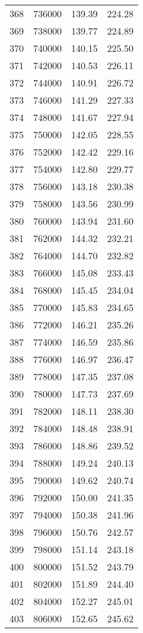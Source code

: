 \documentclass{article}
\begin{document}
\begin{longtable}{@{}l l l l}
368 & 736000 & 139.39 & 224.28\\
369 & 738000 & 139.77 & 224.89\\
370 & 740000 & 140.15 & 225.50\\
371 & 742000 & 140.53 & 226.11\\
372 & 744000 & 140.91 & 226.72\\
373 & 746000 & 141.29 & 227.33\\
374 & 748000 & 141.67 & 227.94\\
375 & 750000 & 142.05 & 228.55\\
376 & 752000 & 142.42 & 229.16\\
377 & 754000 & 142.80 & 229.77\\
378 & 756000 & 143.18 & 230.38\\
379 & 758000 & 143.56 & 230.99\\
380 & 760000 & 143.94 & 231.60\\
381 & 762000 & 144.32 & 232.21\\
382 & 764000 & 144.70 & 232.82\\
383 & 766000 & 145.08 & 233.43\\
384 & 768000 & 145.45 & 234.04\\
385 & 770000 & 145.83 & 234.65\\
386 & 772000 & 146.21 & 235.26\\
387 & 774000 & 146.59 & 235.86\\
388 & 776000 & 146.97 & 236.47\\
389 & 778000 & 147.35 & 237.08\\
390 & 780000 & 147.73 & 237.69\\
391 & 782000 & 148.11 & 238.30\\
392 & 784000 & 148.48 & 238.91\\
393 & 786000 & 148.86 & 239.52\\
394 & 788000 & 149.24 & 240.13\\
395 & 790000 & 149.62 & 240.74\\
396 & 792000 & 150.00 & 241.35\\
397 & 794000 & 150.38 & 241.96\\
398 & 796000 & 150.76 & 242.57\\
399 & 798000 & 151.14 & 243.18\\
400 & 800000 & 151.52 & 243.79\\
401 & 802000 & 151.89 & 244.40\\
402 & 804000 & 152.27 & 245.01\\
403 & 806000 & 152.65 & 245.62\\

\end{longtable}
\end{document}
